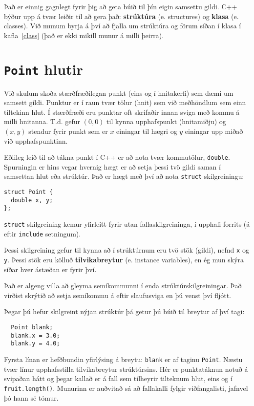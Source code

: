 Það er einnig gagnlegt fyrir þig að geta búið til þín eigin samsettu gildi.
C++ býður upp á tvær leiðir til að gera það: {\bf strúktúra} (e. structures) og {\bf klasa} (e. classes).
Við munum byrja á því að fjalla um strúktúra og förum síðan í klasa í kafla~\ref{class} (það er ekki mikill munur á milli þeirra).

\section{{\tt Point} hlutir}

Við skulum skoða stærðfræðilegan punkt (eins og í hnitakerfi) sem dæmi um samsett gildi.
Punktur er í raun tvær tölur (hnit) sem við meðhöndlum sem einn tiltekinn hlut.
Í stærðfræði eru punktar oft skrifaðir innan sviga með kommu á milli hnitanna.
T.d. gefur $(0, 0)$ til kynna upphafspunkt (hnitamiðju) og $(x, y)$ stendur fyrir punkt sem er $x$ einingar til hægri og $y$ einingar upp miðað við upphafspunktinn.

Eðlileg leið til að tákna punkt í C++ er að nota tvær kommutölur, {\tt double}.
Spurningin er hins vegar hvernig hægt er að setja þessi tvö gildi saman í samsettan hlut eða strúktúr.
Það er hægt með því að nota {\tt struct} skilgreiningu:

\begin{verbatim}
struct Point {
  double x, y;
};  
\end{verbatim}
%
{\tt struct} skilgreining kemur yfirleitt fyrir utan fallaskilgreininga, í upphafi forrits (á eftir {\tt include} setningum).

Þessi skilgreining gefur til kynna að í strúktúrnum eru tvö stök (gildi), nefnd {\tt x} og {\tt y}.
Þessi stök eru kölluð {\bf tilvikabreytur} (e. instance variables), en ég mun skýra síðar hver ástæðan er fyrir því.

Það er algeng villa að gleyma semíkommunni í enda strúktúrskilgreiningar.
Það virðist skrýtið að setja semíkommu á eftir slaufusviga en þú venst því fljótt.

Þegar þú hefur skilgreint nýjan strúktúr þá getur þú búið til breytur af því tagi:

\begin{verbatim}
  Point blank;
  blank.x = 3.0;
  blank.y = 4.0;   
\end{verbatim}
%
Fyrsta línan er hefðbundin yfirlýsing á breytu: {\tt blank} er af taginu {\tt Point}.
Næstu tvær línur upphafsstilla tilvikabreytur strúktúrsins.
Hér er punktatáknun notuð á svipaðan hátt og þegar kallað er á fall sem tilheyrir tilteknum hlut, eins og í {\tt fruit.length()}.
Munurinn er auðvitað sá að fallakalli fylgir viðfangalisti, jafnvel þó hann sé tómur.

